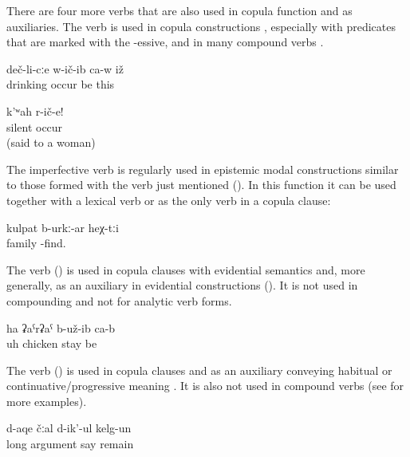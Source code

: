 There are four more verbs that are also used in copula function and as auxiliaries. The verb   is used in copula constructions , especially with predicates that are marked with the -essive, and in many compound verbs .
%
\begin{exe}
	\ex	\label{ex:He became a drinker}
	\gll	deč-li-cːe	w-ič-ib	ca-w	iž\\
		drinking	occur	be	this\\
	\glt	{}

	\ex	\label{ex:Be silent}
	\gll	k'ʷah	r-ič-e!\\
		silent	occur\\
	\glt	{} (said to a woman)
\end{exe}

The imperfective verb   is regularly used in epistemic modal constructions similar to those formed with the verb   just mentioned (). In this function it can be used together with a lexical verb or as the only verb in a copula clause: 

\begin{exe}
	\ex	\label{They are probably a family.COP}
	\gll	kulpat	b-urkː-ar			heχ-tːi\\
		family	-find.	\\
	\glt	{}
\end{exe}

The verb  ()  is used in copula clauses with evidential semantics  and, more generally, as an auxiliary in evidential constructions (). It is not used in compounding and not for analytic verb forms.
%
\begin{exe}
	\ex	\label{ex:Ah, it turned out to be a chicken}
	\gll	ha	ʡaˁrʡaˁ	b-už-ib	ca-b\\
		uh	chicken	stay	be\\
	\glt	{}
\end{exe}

The verb  ()  is used in copula clauses and as an auxiliary conveying habitual or continuative\slash progressive meaning . It is also not used in compound verbs (see  for more examples).
%
\begin{exe}
	\ex	\label{ex:‎‎They were arguing for a long time}
	\gll	d-aqe	čːal	d-ik'-ul	kelg-un\\
		long	argument	say	remain\\
	\glt	{}
\end{exe}
